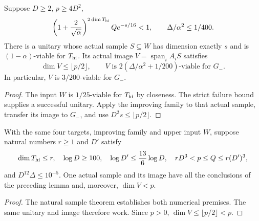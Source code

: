 \begin{lemma}
    \label{lem:nested_actual_sample}
    \leanok
    Suppose $D\ge2$, $p\ge4D^2$,
    \[
        \left(1+\frac2{\sqrt\alpha}\right)^{2\dim T_{\rm hi}}Qe^{-s/16}<1,
        \qquad \Delta/\alpha^2\le1/400.
    \]
    There is a unitary whose actual sample $S\subseteq W$ has dimension
    exactly $s$ and is $(1-\alpha)$-viable for $T_{\rm hi}$.
    Its actual image $V=\operatorname{span}_i A_iS$ satisfies
    \[
        \dim V\le\lfloor p/2\rfloor,
        \qquad V\text{ is }2(\Delta/\alpha^2+1/200)\text{-viable for }G_-.
    \]
    In particular, $V$ is $3/200$-viable for $G_-$.
\end{lemma}
\begin{proof}\leanok
    The input $W$ is $1/25$-viable for $T_{\rm hi}$ by closeness.
    The strict failure bound supplies a successful unitary.
    Apply the improving family to that actual sample, transfer its image
    to $G_-$, and use $D^2s\le\lfloor p/2\rfloor$.
\end{proof}

\begin{lemma}
    \label{lem:nested_actual_sample_from_counts}
    \leanok
    With the same four targets, improving family and upper input $W$,
    suppose natural numbers $r\ge1$ and $D'$ satisfy
    \[
        \dim T_{\rm hi}\le r,\quad
        \log D\ge100,\quad \log D'\le\frac{13}{6}\log D,
        \quad rD^3<p\le Q\le r(D')^3,
    \]
    and $D^{12}\Delta\le10^{-5}$.
    One actual sample and its image have all the conclusions of the
    preceding lemma and, moreover, $\dim V<p$.
\end{lemma}
\begin{proof}\leanok
    The natural sample theorem establishes both numerical premises.
    The same unitary and image therefore work. Since $p>0$,
    $\dim V\le\lfloor p/2\rfloor<p$.
\end{proof}

